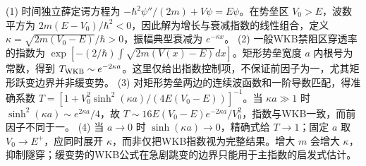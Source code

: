 (1) 时间独立薛定谔方程为 \(-\hbar^2\psi''/(2m)+V\psi=E\psi\)。在势垒区 \(V_0>E\)，波数平方为 \(2m(E-V_0)/\hbar^2<0\)，因此解为增长与衰减指数的线性组合，定义 \(\kappa=\sqrt{2m(V_0-E)}/\hbar>0\)，振幅典型衰减为 \(e^{-\kappa x}\)。
(2) 一般WKB禁阻区穿透率的指数为 \(\exp[-(2/\hbar)\int\sqrt{2m(V(x)-E)}dx]\)。矩形势垒宽度 \(a\) 内根号为常数，得到 \(T_{\rm WKB}\sim e^{-2\kappa a}\)。这里仅给出指数控制项，不保证前因子为一，尤其矩形跃变边界并非缓变势。
(3) 对矩形势垒两边的连续波函数和一阶导数匹配，得准确系数 \(T=[1+V_0^2\sinh^2(\kappa a)/(4E(V_0-E))]^{-1}\)。当 \(\kappa a\gg1\) 时 \(\sinh^2(\kappa a)\sim e^{2\kappa a}/4\)，故 \(T\sim16E(V_0-E)e^{-2\kappa a}/V_0^2\)，指数与WKB一致，而前因子不同于一。
(4) 当 \(a\to0\) 时 \(\sinh(\kappa a)\to0\)，精确式给 \(T\to1\)；固定 \(a\) 取 \(V_0\to E^+\)，应同时展开 \(\kappa\)，而非仅把WKB指数视为完整结果。增大 \(m\) 会增大 \(\kappa\)，抑制隧穿；缓变势的WKB公式在急剧跳变的边界只能用于主指数的启发式估计。
